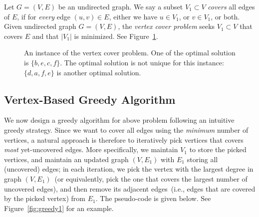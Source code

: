 Let $G = (V, E)$ be an undirected graph. We say a subset $V_1\subset V$
\emph{covers} all edges of $E$, if for \emph{every} edge $(u,v)\in E$,
either we have $u\in V_1$, or $v\in V_1$, or both.
Given undirected graph $G = (V, E)$,
the \emph{vertex cover problem} seeks $V_1\subset V$ that covers $E$
and that $|V_1|$ is minimized. See Figure~\ref{fig:cover}.

\begin{figure}[h]
\centering{}
\caption{An instance of the vertex cover problem.
One of the optimal solution is $\{b,e,c,f\}$.
The optimal solution is not unique for this instance:
$\{d,a,f,e\}$ is another optimal solution.}
\label{fig:cover}
\end{figure}

\subsection*{Vertex-Based Greedy Algorithm}

We now design a greedy algorithm for above problem
following an intuitive greedy strategy.
Since we want to cover all edges using the \emph{minimum} number of vertices,
a natural approach is therefore to iteratively pick vertices that covers \emph{most} yet-uncovered edges.
More specifically, we maintain $V_1$ to store the picked vertices,
and maintain an updated graph $(V, E_1)$ with $E_1$ storing all (uncovered) edges; in each iteration,
we pick the vertex with the largest degree in graph $(V, E_1)$~(or equivalently, pick the one that covers the
largest number of uncovered edges), and then remove its adjacent
edges~(i.e., edges that are covered by the picked vertex) from $E_1$.
The pseudo-code is given below. See Figure~\ref{fig:greedy1} for an example.

\begin{minipage}{0.8\textwidth}
	\xxx
	\xxx
	\xxx
	\xxx
	\xxx
	\xxx
	\xxx
	\xxx
	\xxx
	\xxx
\end{minipage}


